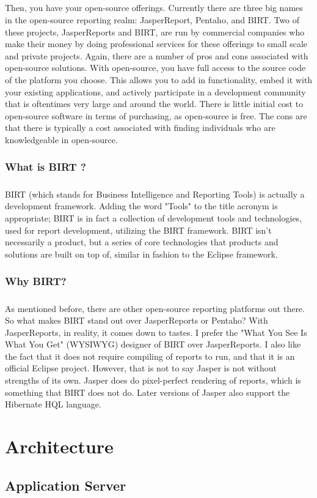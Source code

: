 \documentclass[12pt,a4paper]{report}
\begin{document}
\paragraph{}
Then, you have your open-source offerings. Currently there are three big names in
the open-source reporting realm: JasperReport, Pentaho, and BIRT. Two of these
projects, JasperReports and BIRT, are run by commercial companies who make their
money by doing professional services for these offerings to small scale and private
projects. Again, there are a number of pros and cons associated with open-source
solutions. With open-source, you have full access to the source code of the platform
you choose. This allows you to add in functionality, embed it with your existing
applications, and actively participate in a development community that is oftentimes
very large and around the world. There is little initial cost to open-source software in
terms of purchasing, as open-source is free. The cons are that there is typically a cost
associated with finding individuals who are knowledgeable in open-source.

\subsection{What is BIRT ?}
\paragraph{}
BIRT (which stands for Business Intelligence and Reporting Tools) is actually a development 
framework. Adding the word "Tools" to the title acronym is appropriate; BIRT is in fact a 
collection of development tools and technologies, used for report development, utilizing the 
BIRT framework. BIRT isn't necessarily a product, but a series of core technologies that 
products and solutions are built on top of, similar in fashion to the Eclipse framework.

\subsection{Why BIRT?}
\paragraph{}
As mentioned before, there are other open-source reporting platforms out there.
So what makes BIRT stand out over JasperReports or Pentaho? With JasperReports,
in reality, it comes down to tastes. I prefer the "What You See Is What You Get"
(WYSIWYG) designer of BIRT over JasperReports. I also like the fact that it does
not require compiling of reports to run, and that it is an official Eclipse project.
However, that is not to say Jasper is not without strengths of its own. Jasper does do
pixel-perfect rendering of reports, which is something that BIRT does not do. Later
versions of Jasper also support the Hibernate HQL language.


\chapter{Architecture}
\section{Application Server}
\end{document}
